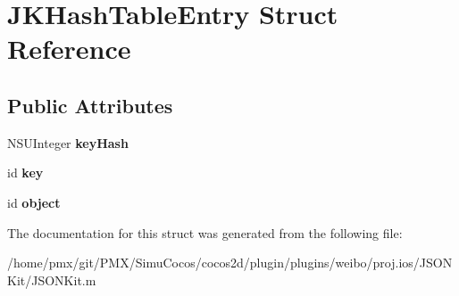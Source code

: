\hypertarget{structJKHashTableEntry}{}\section{J\+K\+Hash\+Table\+Entry Struct Reference}
\label{structJKHashTableEntry}
\subsection*{Public Attributes}
\begin{DoxyCompactItemize}
\item 
\mbox{\label{structJKHashTableEntry_a3627d1eea6b9d771b73d460d110a125a}} 
N\+S\+U\+Integer {\bfseries key\+Hash}
\item 
\mbox{\label{structJKHashTableEntry_a14459841f0c97cce172556d8338234bd}} 
id {\bfseries key}
\item 
\mbox{\label{structJKHashTableEntry_a47f523fa961c85cbb5df375b802b8316}} 
id {\bfseries object}
\end{DoxyCompactItemize}


The documentation for this struct was generated from the following file\+:\begin{DoxyCompactItemize}
\item 
/home/pmx/git/\+P\+M\+X/\+Simu\+Cocos/cocos2d/plugin/plugins/weibo/proj.\+ios/\+J\+S\+O\+N\+Kit/J\+S\+O\+N\+Kit.\+m\end{DoxyCompactItemize}
